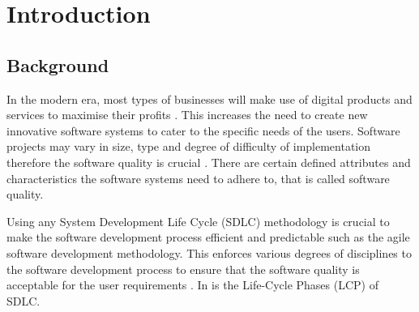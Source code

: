 \chapter{Introduction}
\label{chap:1}

\section{Background}\label{section:ch1_background}
In the modern era, most types of businesses will make use of digital products and services to maximise their profits \cite{Gralha2018}. This increases the need to create new innovative software systems to cater to the specific needs of the users. Software projects may vary in size, type and degree of difficulty of implementation therefore the software quality is crucial \cite{Khan2013}. There are certain defined attributes and characteristics the software systems need to adhere to, that is called software quality.\par Using any System Development Life Cycle (SDLC) methodology is crucial to make the software development process efficient and predictable such as the agile software development methodology. This enforces various degrees of disciplines to the software development process to ensure that the software quality is acceptable for the user requirements \cite{Khan2013, Al-Saiyd2015}. In  is the Life-Cycle Phases (LCP) of SDLC.


